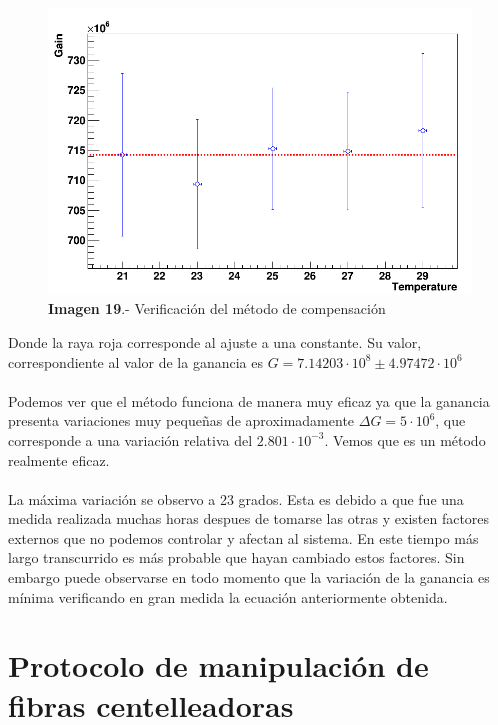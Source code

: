 \documentclass[11pt, a4paper]{article}
\begin{document}
\begin{figure}[hbtp]
\centering
\includegraphics[scale=0.2]{compensacion.png}
\caption{\textbf{Imagen 19}.- Verificación del método de compensación}
\end{figure}

Donde la raya roja corresponde al ajuste a una constante. Su valor, correspondiente al valor de la ganancia es $G=7.14203 \cdot 10^8 \pm 4.97472 \cdot 10^6$

\paragraph {}
Podemos ver que el método funciona de manera muy eficaz ya que la ganancia presenta variaciones muy pequeñas de aproximadamente $\Delta G=5 \cdot 10^6$, que corresponde a una variación relativa del $2.801 \cdot 10^{-3} $. Vemos que es un método realmente eficaz.
\paragraph {}
La máxima variación se observo a 23 grados. Esta es debido a que fue una medida realizada muchas horas despues de tomarse las otras y existen factores externos que no podemos controlar y afectan al sistema. En este tiempo más largo transcurrido es más probable que hayan cambiado estos factores. Sin embargo puede observarse en todo momento que la variación de la ganancia es mínima verificando en gran medida la ecuación anteriormente obtenida.





\section {Protocolo de manipulación de fibras centelleadoras}
\end{document}
